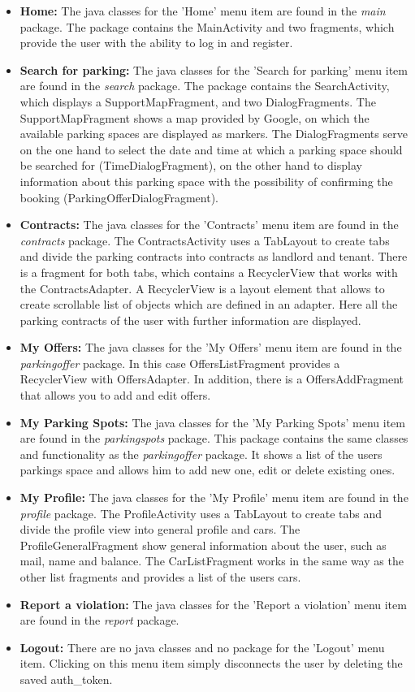 \begin{itemize}
\item \textbf{Home:} The java classes for the 'Home' menu item are found in the \textit{main} package. The package contains the MainActivity and two fragments, which provide the user with the ability to log in and register.
\item \textbf{Search for parking:} The java classes for the 'Search for parking' menu item are found in the \textit{search} package. The package contains the SearchActivity, which displays a SupportMapFragment, and two DialogFragments. The SupportMapFragment shows a map provided by Google, on which the available parking spaces are displayed as markers. The DialogFragments serve on the one hand to select the date and time at which a parking space should be searched for (TimeDialogFragment), on the other hand to display information about this parking space with the possibility of confirming the booking (ParkingOfferDialogFragment).
\item \textbf{Contracts:} The java classes for the 'Contracts' menu item are found in the \textit{contracts} package. The ContractsActivity uses a TabLayout to create tabs and divide the parking contracts into contracts as landlord and tenant. There is a fragment for both tabs, which contains a RecyclerView that works with the ContractsAdapter. A RecyclerView is a layout element that allows to create scrollable list of objects which are defined in an adapter. Here all the parking contracts of the user with further information are displayed.
\item \textbf{My Offers:} The java classes for the 'My Offers' menu item are found in the \textit{parkingoffer} package. In this case OffersListFragment provides a RecyclerView with OffersAdapter. In addition, there is a OffersAddFragment that allows you to add and edit offers.
\item \textbf{My Parking Spots:} The java classes for the 'My Parking Spots' menu item are found in the \textit{parkingspots} package. This package contains the same classes and functionality as the \textit{parkingoffer} package. It shows a list of the users parkings space and allows him to add new one, edit or delete existing ones.
\item \textbf{My Profile:} The java classes for the 'My Profile' menu item are found in the \textit{profile} package. The ProfileActivity uses a TabLayout to create tabs and divide the profile view into general profile and cars. The ProfileGeneralFragment show general information about the user, such as mail, name and balance. The CarListFragment works in the same way as the other list fragments and provides a list of the users cars.
\item \textbf{Report a violation:} The java classes for the 'Report a violation' menu item are found in the \textit{report} package.
\item \textbf{Logout:} There are no java classes and no package for the 'Logout' menu item. Clicking on this menu item simply disconnects the user by deleting the saved auth\_token.
\end{itemize}

